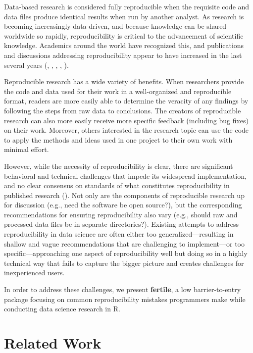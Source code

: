 \documentclass[APA,LATO1COL]{WileyNJD-v2}\usepackage[]{graphicx}\usepackage[]{color}
\newcommand{\pkg}[1]{\textbf{#1}}
\begin{document}
Data-based research is considered fully reproducible when the requisite code and data files produce identical results when run by another analyst. As research is becoming increasingly data-driven, and because knowledge can be shared worldwide so rapidly, reproducibility is critical to the advancement of scientific knowledge. Academics around the world have recognized this, and publications and discussions addressing reproducibility appear to have increased in the last several years (\cite{sep-scientific-reproducibility}, \cite{plos-biology}, \cite{bioessays-gosselin}, \cite{eisner-reproducibility}, \cite{engineering-reproducibility}). 

Reproducible research has a wide variety of benefits. When researchers provide the code and data used for their work in a well-organized and reproducible format, readers are more easily able to determine the veracity of any findings by following the steps from raw data to conclusions. The creators of reproducible research can also more easily receive more specific feedback (including bug fixes) on their work. Moreover, others interested in the research topic can use the code to apply the methods and ideas used in one project to their own work with minimal effort.

However, while the necessity of reproducibility is clear, there are significant behavioral and technical challenges that impede its widespread implementation, and no clear consensus on standards of what constitutes reproducibility in published research (\cite{peng2009bio}). Not only are the components of reproducible research up for discussion (e.g., need the software be open source?), but the corresponding recommendations for ensuring reproducibility also vary (e.g., should raw and processed data files be in separate directories?).
Existing attempts to address reproducibility in data science are often either too generalized---resulting in shallow and vague recommendations that are challenging to implement---or too specific---approaching one aspect of reproducibility well but doing so in a highly technical way that fails to capture the bigger picture and creates challenges for inexperienced users.

In order to address these challenges, we present \pkg{fertile}, a low barrier-to-entry package focusing on common reproducibility mistakes programmers make while conducting data science research in R.


\section{Related Work}\label{sec:lit}
\end{document}
